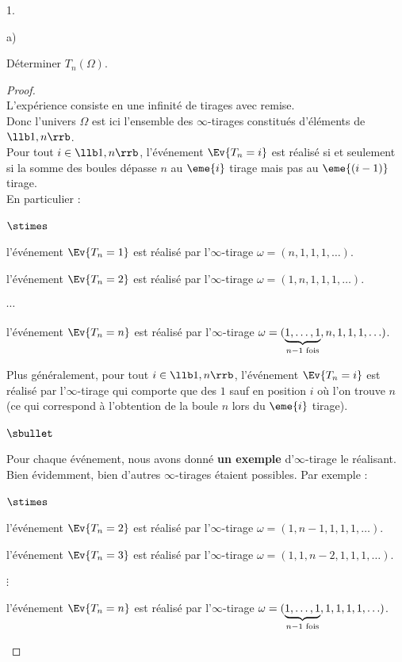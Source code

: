 \documentclass[11pt]{article}%
\begin{document}
\begin{noliste}{1.}

\item \begin{noliste}{a)}
  \item Déterminer $T_n(\Omega)$.
    
    \begin{proof}~\\
      L'expérience consiste en une infinité de tirages avec 
      remise. \\
      Donc l'univers $\Omega$ est ici l'ensemble des 
      $\infty$-tirages constitués d'éléments de $\llb 1,n\rrb$.\\
      Pour tout $i\in \llb 1, n\rrb$, l'événement 
      $\Ev{T_n=i}$ est réalisé si et seulement si la somme des boules 
      dépasse $n$ au $\eme{i}$ tirage mais pas au $\eme{(i-1)}$ 
      tirage.\\
      En particulier :
      \begin{noliste}{$\stimes$}
      \item l'événement $\Ev{T_n=1}$ est réalisé par l'$\infty$-tirage
        $\omega=(n,1,1,1,\hdots)$.
      \item l'événement $\Ev{T_n=2}$ est réalisé par l'$\infty$-tirage
        $\omega=(1,n,1,1,1,\hdots)$.
      \item $\cdots$
      \item l'événement $\Ev{T_n=n}$ est réalisé par l'$\infty$-tirage
        $\omega=(\underbrace{1,\hdots,1}_{\scriptsize{n-1 \mbox{ 
              fois}}},n,1,1,1,\hdots)$.
      \end{noliste}
      Plus généralement, pour tout $i\in \llb 1, n\rrb$, l'événement
      $\Ev{T_n=i}$ est réalisé par l'$\infty$-tirage qui comporte que
      des $1$ sauf en position $i$ où l'on trouve $n$(ce qui
      correspond à l'obtention de la boule $n$ lors du $\eme{i}$
      tirage).%
      
      \begin{remark}
	\begin{noliste}{$\sbullet$}
        \item Pour chaque événement, nous avons donné {\bf un 
            exemple} d'$\infty$-tirage le réalisant.\\
	  Bien évidemment, bien d'autres $\infty$-tirages étaient 
	  possibles. Par exemple :
	  \begin{noliste}{$\stimes$}
          \item l'événement $\Ev{T_n=2}$ est réalisé par 
	    l'$\infty$-tirage $\omega=(1,n-1,1,1,1,\hdots)$.
          \item l'événement $\Ev{T_n=3}$ est réalisé par 
	    l'$\infty$-tirage $\omega=(1,1,n-2,1,1,1,\hdots)$.
          \item $\vdots$
          \item l'événement $\Ev{T_n=n}$ est réalisé par
            l'$\infty$-tirage
            $\omega=(\underbrace{1,\hdots,1}_{\scriptsize{n-1 \mbox{
                  fois}}},1,1,1,1,\hdots)$.
	  \end{noliste}
	  

\end{noliste}
\end{remark}
\end{proof}
\end{noliste}
\end{noliste}
\end{document}
